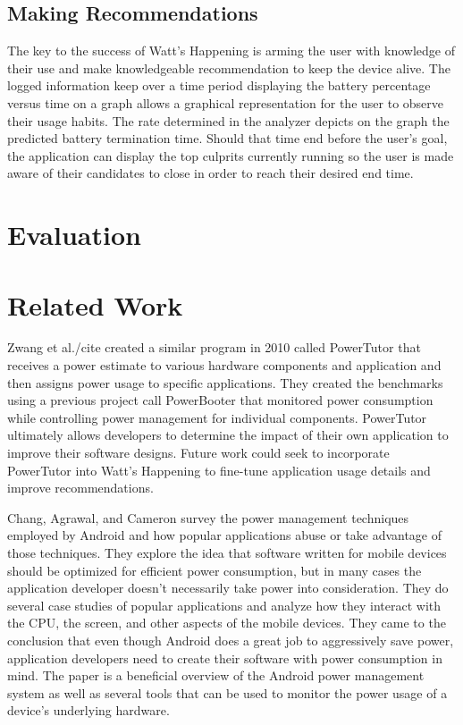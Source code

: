 \documentclass[11pt,twocolumn]{article}
\begin{document}
\subsection*{Making Recommendations}
The key to the success of Watt's Happening is arming the user with knowledge of their use and make knowledgeable recommendation to keep the device alive.  
The logged information keep over a time period displaying the battery percentage versus time on a graph allows a graphical representation for the user to observe their usage habits. 
The rate determined in the analyzer depicts on the graph the predicted battery termination time.  
Should that time end before the user's goal, the application can display the top culprits currently running so the user is made aware of their candidates to close in order to reach their desired end time.


\section*{Evaluation}


\section*{Related Work}
Zwang et al./cite{} created a similar program in 2010 called PowerTutor that receives a power estimate to various hardware components and application and then assigns power usage to specific applications.  
They created the benchmarks using a previous project call PowerBooter that monitored power consumption while controlling power management for individual components.  
PowerTutor ultimately allows developers to determine the impact of their own application to improve their software designs.  
Future work could seek to incorporate PowerTutor into Watt's Happening to fine-tune application usage details and improve recommendations.

Chang, Agrawal, and Cameron survey the power management techniques employed by Android and how popular applications abuse or take advantage of those techniques\cite{energy-aware}. 
They explore the idea that software written for mobile devices should be optimized for efficient power consumption, but in many cases the application developer doesn't necessarily take power into consideration. 
They do several case studies of popular applications and analyze how they interact with the CPU, the screen, and other aspects of the mobile devices. 
They came to the conclusion that even though Android does a great job to aggressively save power, application developers need to create their software with power consumption in mind. 
The paper is a beneficial overview of the Android power management system as well as several tools that can be used to monitor the power usage of a device's underlying hardware. 
\end{document}

